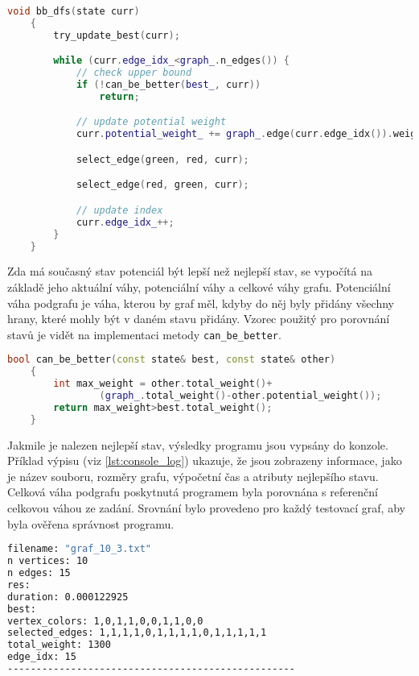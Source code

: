 \begin{lstlisting}[language=C++, label={lst:bb_dfs}, title={Metoda pro prohledávání stavového prostoru}]
    void bb_dfs(state curr)
    {
        try_update_best(curr);

        while (curr.edge_idx_<graph_.n_edges()) {
            // check upper bound
            if (!can_be_better(best_, curr))
                return;

            // update potential weight
            curr.potential_weight_ += graph_.edge(curr.edge_idx()).weight;

            select_edge(green, red, curr);

            select_edge(red, green, curr);

            // update index
            curr.edge_idx_++;
        }
    }
\end{lstlisting}

Zda má současný stav potenciál být lepší než nejlepší stav, se vypočítá na základě jeho aktuální váhy, potenciální váhy a celkové váhy grafu.
Potenciální váha podgrafu je váha, kterou by graf měl, kdyby do něj byly přidány všechny hrany, které mohly být v daném stavu přidány.
Vzorec použitý pro porovnání stavů je vidět na implementaci metody \texttt{can\_be\_better}.

\begin{lstlisting}[language=C++, label={lst:can_be_better}, title={Metoda pro ořezávání shora}]
    bool can_be_better(const state& best, const state& other)
    {
        int max_weight = other.total_weight()+
                (graph_.total_weight()-other.potential_weight());
        return max_weight>best.total_weight();
    }
\end{lstlisting}

Jakmile je nalezen nejlepší stav, výsledky programu jsou vypsány do konzole.
Příklad výpisu (viz \ref{lst:console_log}) ukazuje, že jsou zobrazeny informace, jako je název souboru, rozměry grafu, výpočetní čas a atributy nejlepšího stavu.
Celková váha podgrafu poskytnutá programem byla porovnána s referenční celkovou váhou ze zadání.
Srovnání bylo provedeno pro každý testovací graf, aby byla ověřena správnost programu.

\begin{lstlisting}[language=bash, label={lst:console_log}, title={Příklad výpisu výsledků}]
filename: "graf_10_3.txt"
n vertices: 10
n edges: 15
res:
duration: 0.000122925
best:
vertex_colors: 1,0,1,1,0,0,1,1,0,0
selected_edges: 1,1,1,1,0,1,1,1,1,0,1,1,1,1,1
total_weight: 1300
edge_idx: 15
--------------------------------------------------
\end{lstlisting}






